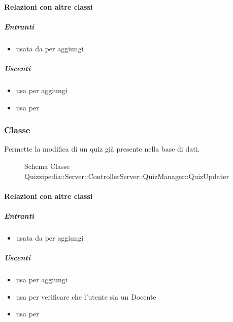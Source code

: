 \paragraph{Relazioni con altre classi}
\subparagraph{Entranti}
\begin{itemize}
\item usata da  per aggiungi
\end{itemize}
\subparagraph{Uscenti}
\begin{itemize}
\item usa  per aggiungi
\item usa  per 
\end{itemize}
\subsubsection{Classe }
Permette la modifica di un quiz già presente nella base di dati.
\begin{figure}[H]
\centering
\noindent{}
\caption[Schema Classe QuizUpdater]{Schema Classe Quizzipedia::Server::ControllerServer::QuizManager::QuizUpdater}
\end{figure}
\paragraph{Relazioni con altre classi}
\subparagraph{Entranti}
\begin{itemize}
\item usata da  per aggiungi
\end{itemize}
\subparagraph{Uscenti}
\begin{itemize}
\item usa  per aggiungi
\item usa  per verificare che l'utente sia un Docente
\item usa  per 
\end{itemize}
